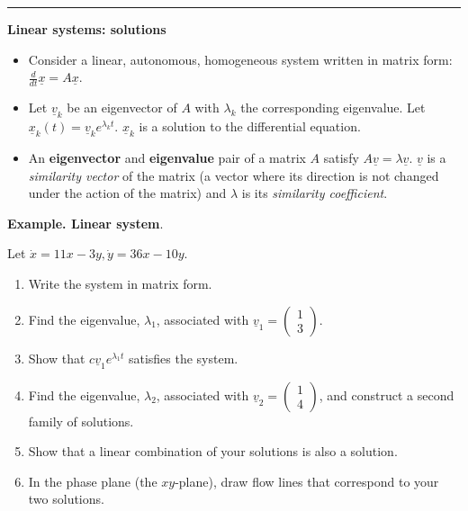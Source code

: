 \documentclass[12pt,letterpaper,noanswers]{exam}
\begin{document}
\vspace{0.2cm}
\hrule
\vspace{0.2cm}



\noindent\textbf{Linear systems: solutions}
\begin{tcolorbox}
\begin{itemize}
\itemsep0em
    \item Consider a linear, autonomous, homogeneous system written in matrix form: $\frac{d}{dt}\underline x = A \underline x$.  
    \item Let $\underline v_k$ be an eigenvector of $A$ with $\lambda_k$ the corresponding eigenvalue.  Let $\underline x_k(t) = \underline v_k e^{\lambda_k t}$.  $\underline x_k$ is a solution to the differential equation.
    \item An \textbf{eigenvector} and \textbf{eigenvalue} pair of a matrix $A$ satisfy $A\underline v = \lambda\underline v$.  $\underline v$ is a \emph{similarity vector} of the matrix (a vector where its direction is not changed under the action of the matrix) and $\lambda$ is its \emph{similarity coefficient}.
\end{itemize}
\end{tcolorbox}
\noindent\textbf{Example.  Linear system}.  

Let $\dot x = 11x - 3y, \dot y = 36x - 10y$.
\begin{enumerate}
    \item Write the system in matrix form.
    \vspace{0.7in}
    \item Find the eigenvalue, $\lambda_1$, associated with $\underline v_1 = \left(\begin{array}{c} 1 \\ 3\end{array}\right)$.
    \vspace{1in}
    \item Show that $c\underline v_1 e^{\lambda_1 t}$ satisfies the system.
    \vspace{1.5in}
    \item Find the eigenvalue, $\lambda_2$, associated with $\underline v_2 = \left(\begin{array}{c} 1 \\ 4\end{array}\right)$, and construct a second family of solutions.
    \vspace{1in}
    \item Show that a linear combination of your solutions is also a solution.
    \vspace{2in}
    \item In the phase plane (the $xy$-plane), draw flow lines that correspond to your two solutions.
    \vspace{2in}
    
\end{enumerate}
\end{document}
